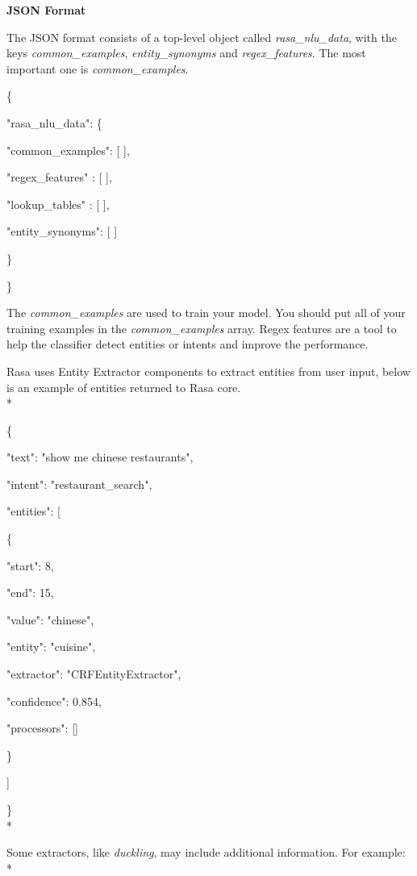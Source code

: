 \textbf{JSON Format}

The JSON format consists of a top-level object called \textit{rasa\_nlu\_data}, with the keys\textit{ common\_examples},\textit{ entity\_synonyms} and \textit{regex\_features}. The most important one is \textit{common\_examples}.
\newline
\newline

\{

    \qquad"rasa\_nlu\_data": \{

        \qquad"common\_examples": [ ],

        \qquad"regex\_features" : [ ],

        \qquad"lookup\_tables"  : [ ],

        \qquad"entity\_synonyms": [ ]

    \quad\}

\}

The \textit{common\_examples} are used to train your model. You should put all of your training examples in the \textit{common\_examples} array. Regex features are a tool to help the classifier detect entities or intents and improve the performance.


Rasa uses Entity Extractor components to extract entities from user input, below is an example of entities returned to Rasa core.
\\*

\{

  \quad"text": "show me chinese restaurants",

  \quad"intent": "restaurant\_search",

  \quad"entities": [

    \qquad\{

      \quad\qquad"start": 8,

      \quad\qquad"end": 15,

      \quad\qquad"value": "chinese",

      \quad\qquad"entity": "cuisine",

      \quad\qquad"extractor": "CRFEntityExtractor",

      \quad\qquad"confidence": 0.854,

      \quad\qquad"processors": []

    \qquad\}

  \quad]

\}
\\*

Some extractors, like \textit{duckling}, may include additional information. For example:
\\*


